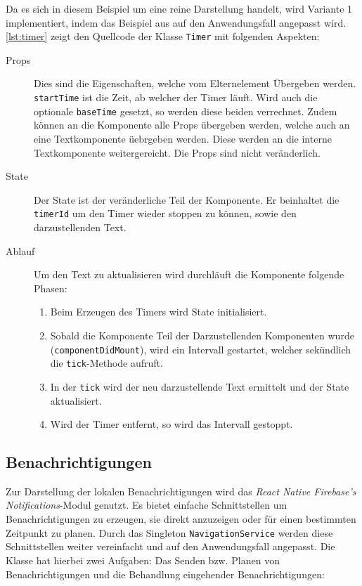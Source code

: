 Da es sich in diesem Beispiel um eine reine Darstellung handelt,
wird Variante 1 implementiert, indem das Beispiel aus \cite{Timersin85:online} auf den Anwendungsfall angepasst wird.
\autoref{lst:timer} zeigt den Quellcode der Klasse \texttt{Timer} mit folgenden Aspekten:
\begin{description}
    \item[Props] Dies sind die Eigenschaften, welche vom Elternelement Übergeben werden.
    \texttt{startTime} ist die Zeit, ab welcher der Timer läuft.
    Wird auch die optionale \texttt{baseTime} gesetzt, so werden diese beiden verrechnet.
    Zudem können an die Komponente alle Props übergeben werden, welche auch an eine Textkomponente üebrgeben werden.
    Diese werden an die interne Textkomponente weitergereicht.
    Die Props sind nicht veränderlich.
    \item[State] Der State ist der veränderliche Teil der Komponente.
    Er beinhaltet die \texttt{timerId} um den Timer wieder stoppen zu können,
    sowie den darzustellenden Text.
    \item[Ablauf]
    Um den Text zu aktualisieren wird durchläuft die Komponente folgende Phasen:
    \begin{enumerate}
        \item Beim Erzeugen des Timers wird State initialisiert.
        \item Sobald die Komponente Teil der Darzustellenden Komponenten wurde (\texttt{componentDidMount}),
        wird ein Intervall gestartet, welcher sekündlich die \texttt{tick}-Methode aufruft.
        \item In der \texttt{tick} wird der neu darzustellende Text ermittelt und der State aktualisiert.
        \item Wird der Timer entfernt, so wird das Intervall gestoppt.
    \end{enumerate}
\end{description}



\subsection{Benachrichtigungen}\label{sec:besonderheiten-benachrichtigung}
Zur Darstellung der lokalen Benachrichtigungen wird das \emph{React Native Firebase's Notifications}-Modul genutzt.
Es bietet einfache Schnittstellen um Benachrichtigungen zu erzeugen,
sie direkt anzuzeigen oder für einen bestimmten Zeitpunkt zu planen.
Durch das Singleton \texttt{NavigationService} werden diese Schnittstellen weiter vereinfacht und auf den Anwendungsfall angepasst.
Die Klasse hat hierbei zwei Aufgaben: Das Senden bzw. Planen von Benachrichtigungen und die Behandlung eingehender Benachrichtigungen:

